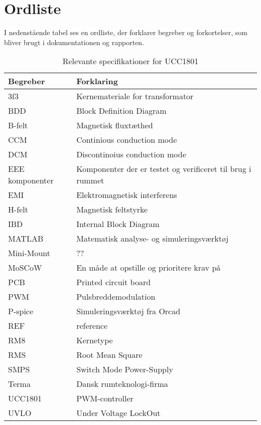 

\clearpage

\section{Ordliste}
I nedenstående tabel ses en ordliste, der forklarer begreber og forkortelser, som bliver brugt i dokumentationen og rapporten.
\begin{table}[H] 			
	\centering
	\begin{tabularx}{\textwidth}{|X|l|} 
		\hline
		\textbf{Begreber} & \textbf{Forklaring} \\ \hline
		3f3 & Kernemateriale for transformator \\ \hline
		BDD & Block Definition Diagram \\ \hline
		B-felt & Magnetisk fluxtæthed \\ \hline
		CCM & Continious conduction mode \\ \hline
		DCM & Discontinoius conduction mode \\ \hline
		EEE komponenter & Komponenter der er testet og verificeret til brug i rummet \\ \hline
		EMI & Elektromagnetisk interferens \\ \hline
		H-felt & Magnetisk feltstyrke \\ \hline
		IBD & Internal Block Diagram \\ \hline
		MATLAB & Matematisk analyse- og simuleringsværktøj \\ \hline
		Mini-Mount & ?? \\ \hline
		MoSCoW & En måde at opstille og prioritere krav på \\ \hline
		PCB & Printed circuit board \\ \hline
		PWM & Pulsbreddemodulation \\ \hline
		P-spice & Simuleringsværktøj fra Orcad \\ \hline
		REF & reference \\ \hline
		RM8 & Kernetype \\ \hline
		RMS & Root Mean Square \\ \hline
		SMPS & Switch Mode Power-Supply \\ \hline
		Terma & Dansk rumteknologi-firma  \\ \hline
		UCC1801 & PWM-controller \\ \hline
		UVLO & Under Voltage LockOut \\ \hline
	\end{tabularx}
	
	\caption{Relevante specifikationer for UCC1801}
	\label{tab:ucc1801_specs}
\end{table}

